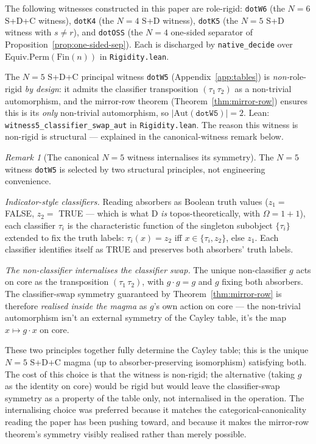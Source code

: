 \documentclass[sigconf,screen]{acmart}
\newcommand{\dotop}{\cdot}
\newcommand{\Fin}{\mathrm{Fin}}
\theoremstyle{remark}
\newtheorem{remark}{Remark}
\begin{document}
\begin{proposition}
\label{prop:witness-rigid}
The following witnesses constructed in this paper are role-rigid:
\texttt{dotW6} (the $N\!=\!6$ S+D+C witness),
\texttt{dotK4} (the $N\!=\!4$ S+D witness),
\texttt{dotK5} (the $N\!=\!5$ S+D witness with $s \neq r$), and
\texttt{dotOSS} (the $N\!=\!4$ one-sided separator of Proposition~\ref{prop:one-sided-sep}). Each is discharged by \texttt{native\_decide} over $\mathrm{Equiv.Perm}(\Fin(n))$ in \texttt{Rigidity.lean}.

The $N\!=\!5$ S+D+C principal witness \texttt{dotW5} (Appendix~\ref{app:tables}) is \emph{non-}role-rigid \emph{by design}: it admits the classifier transposition $(\tau_1\,\tau_2)$ as a non-trivial automorphism, and the mirror-row theorem (Theorem~\ref{thm:mirror-row}) ensures this is its \emph{only} non-trivial automorphism, so $|\mathrm{Aut}(\texttt{dotW5})| = 2$. Lean: \texttt{witness5\_classifier\_swap\_aut} in \texttt{Rigidity.lean}. The reason this witness is non-rigid is structural — explained in the canonical-witness remark below.
\end{proposition}

\begin{remark}[The canonical $N\!=\!5$ witness internalises its symmetry]
\label{rem:canonical-witness}
The $N\!=\!5$ witness \texttt{dotW5} is selected by two structural principles, not engineering convenience.

\emph{Indicator-style classifiers.} Reading absorbers as Boolean truth values ($z_1 = $ FALSE, $z_2 = $ TRUE — which is what D \emph{is} topos-theoretically, with $\Omega = 1+1$), each classifier $\tau_i$ is the characteristic function of the singleton subobject $\{\tau_i\}$ extended to fix the truth labels: $\tau_i(x) = z_2$ iff $x \in \{\tau_i, z_2\}$, else $z_1$. Each classifier identifies itself as TRUE and preserves both absorbers' truth labels.

\emph{The non-classifier internalises the classifier swap.} The unique non-classifier $g$ acts on core as the transposition $(\tau_1\,\tau_2)$, with $g \dotop g = g$ and $g$ fixing both absorbers. The classifier-swap symmetry guaranteed by Theorem~\ref{thm:mirror-row} is therefore \emph{realised inside the magma} as $g$'s own action on core — the non-trivial automorphism isn't an external symmetry of the Cayley table, it's the map $x \mapsto g \dotop x$ on core.

These two principles together fully determine the Cayley table; this is the unique $N\!=\!5$ S+D+C magma (up to absorber-preserving isomorphism) satisfying both. The cost of this choice is that the witness is non-rigid; the alternative (taking $g$ as the identity on core) would be rigid but would leave the classifier-swap symmetry as a property of the table only, not internalised in the operation. The internalising choice was preferred because it matches the categorical-canonicality reading the paper has been pushing toward, and because it makes the mirror-row theorem's symmetry visibly realised rather than merely possible.
\end{remark}
\end{document}
